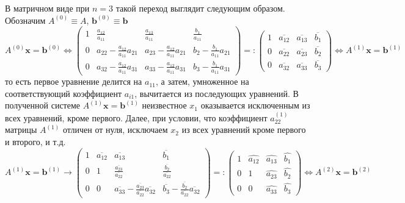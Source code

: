 В матричном виде при $n=3$ такой переход выглядит следующим образом.
Обозначим $A^{(0)}\equiv A$, $\mathbf{b}^{(0)}\equiv \mathbf{b}$
\[
  A^{(0)}\mathbf{x}=\mathbf{b}^{(0)}\Leftrightarrow
  \left(\begin{array}{ccc|c}
      1 & \frac{a_{12}}{a_{11}}              & \frac{a_{13}}{a_{11}}              & \frac{b_1}{a_{11}}             \\
      0 & a_{22}-\frac{a_{12}}{a_{11}}a_{21} & a_{23}-\frac{a_{12}}{a_{11}}a_{21} & b_{2}-\frac{b_1}{a_{11}}a_{21} \\
      0 & a_{32}-\frac{a_{12}}{a_{11}}a_{31} & a_{33}-\frac{a_{12}}{a_{11}}a_{31} & b_{3}-\frac{b_1}{a_{11}}a_{31}
    \end{array}\right)=:
  \left(\begin{array}{ccc|c}
      1 & \overline{a_{12}} & \overline{a_{13}} & \overline{b_{1}} \\
      0 & \overline{a_{22}} & \overline{a_{23}} & \overline{b_{2}} \\
      0 & \overline{a_{32}} & \overline{a_{33}} & \overline{b_{3}}
    \end{array}\right)\Leftrightarrow A^{(1)}\mathbf{x}=\mathbf{b}^{(1)}
\]
то есть первое уравнение делится на $a_{11}$, а затем, умноженное на соответствующий
коэффициент $a_{i1}$, вычитается из последующих уравнений. В полученной
системе $A^{(1)}\mathbf{x}=\mathbf{b}^{(1)}$ неизвестное $x_1$ оказывается исключенным
из всех уравнений, кроме первого. Далее, при условии, что коэффициент
$a_{22}^{(1)}$ матрицы $A^{(1)}$ отличен от нуля, исключаем $x_2$ из всех уравнений кроме
первого и второго, и т.д.
\[
  A^{(1)}\mathbf{x}=\mathbf{b}^{(1)}\rightarrow
  \left(\begin{array}{ccc|c}
      1 & \overline{a_{12}} & \overline{a_{13}}                                                              & \overline{b_{1}}                                                             \\
      0 & 1                 & \frac{\overline{a_{23}}}{\overline{a_{22}}}                                    & \frac{\overline{b_{2}}}{\overline{a_{22}}}                                   \\
      0 & 0                 & \overline{a_{33}}-\frac{\overline{a_{23}}}{\overline{a_{22}}}\overline{a_{32}} & \overline{b_{3}}-\frac{\overline{b_{2}}}{\overline{a_{22}}}\overline{a_{32}}
    \end{array}\right)=:
  \left(\begin{array}{ccc|c}
      1 & \widehat{a_{12}} & \widehat{a_{13}} & \widehat{b_{1}} \\
      0 & 1                & \widehat{a_{23}} & \widehat{b_{2}} \\
      0 & 0                & \widehat{a_{33}} & \widehat{b_{3}}
    \end{array}\right)\Leftrightarrow A^{(2)}\mathbf{x}=\mathbf{b}^{(2)}
\]

